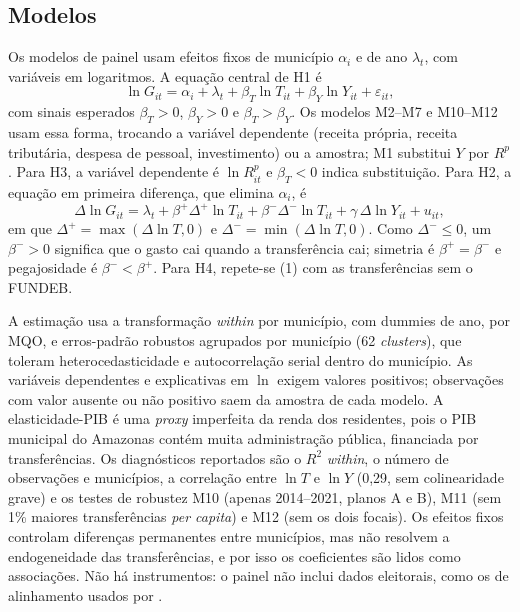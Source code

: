 \documentclass[10pt,twocolumn]{article}
\begin{document}
\subsection{Modelos}
Os modelos de painel usam efeitos fixos de município $\alpha_i$ e de ano $\lambda_t$, com variáveis em logaritmos. A equação central de H1 é
\begin{equation}
\ln G_{it}=\alpha_i+\lambda_t+\beta_T\ln T_{it}+\beta_Y\ln Y_{it}+\varepsilon_{it},
\end{equation}
com sinais esperados $\beta_T>0$, $\beta_Y>0$ e $\beta_T>\beta_Y$. Os modelos M2--M7 e M10--M12 usam essa forma, trocando a variável dependente (receita própria, receita tributária, despesa de pessoal, investimento) ou a amostra; M1 substitui $Y$ por $R^p$. Para H3, a variável dependente é $\ln R^{p}_{it}$ e $\beta_T<0$ indica substituição. Para H2, a equação em primeira diferença, que elimina $\alpha_i$, é
\begin{equation}
\Delta\ln G_{it}=\lambda_t+\beta^{+}\Delta^{+}\ln T_{it}+\beta^{-}\Delta^{-}\ln T_{it}+\gamma\,\Delta\ln Y_{it}+u_{it},
\end{equation}
em que $\Delta^{+}=\max(\Delta\ln T,0)$ e $\Delta^{-}=\min(\Delta\ln T,0)$. Como $\Delta^{-}\le 0$, um $\beta^{-}>0$ significa que o gasto cai quando a transferência cai; simetria é $\beta^{+}=\beta^{-}$ e pegajosidade é $\beta^{-}<\beta^{+}$. Para H4, repete-se (1) com as transferências sem o FUNDEB.

A estimação usa a transformação \textit{within} por município, com dummies de ano, por MQO, e erros-padrão robustos agrupados por município (62 \textit{clusters}), que toleram heterocedasticidade e autocorrelação serial dentro do município. As variáveis dependentes e explicativas em $\ln$ exigem valores positivos; observações com valor ausente ou não positivo saem da amostra de cada modelo. A elasticidade-PIB é uma \textit{proxy} imperfeita da renda dos residentes, pois o PIB municipal do Amazonas contém muita administração pública, financiada por transferências. Os diagnósticos reportados são o $R^2$ \textit{within}, o número de observações e municípios, a correlação entre $\ln T$ e $\ln Y$ (0,29, sem colinearidade grave) e os testes de robustez M10 (apenas 2014--2021, planos A e B), M11 (sem 1\% maiores transferências \textit{per capita}) e M12 (sem os dois focais). Os efeitos fixos controlam diferenças permanentes entre municípios, mas não resolvem a endogeneidade das transferências, e por isso os coeficientes são lidos como associações. Não há instrumentos: o painel não inclui dados eleitorais, como os de alinhamento usados por \citet{ferreira2019}.
\end{document}
